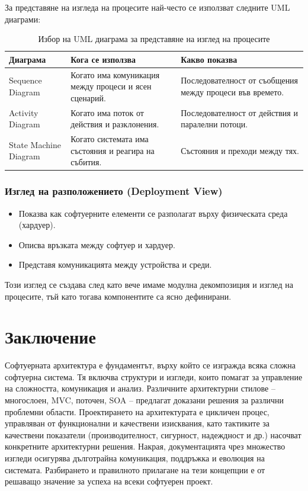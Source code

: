 \documentclass{scrartcl}
\begin{document}
\begin{FlushLeft}
За представяне на изгледа на процесите най-често се използват следните UML диаграми:

\begin{table}[H]
\centering
\caption{Избор на UML диаграма за представяне на изглед на процесите}
\begin{tabular}{|p{3cm}|p{4cm}|p{5cm}|}
\hline
\textbf{Диаграма} & \textbf{Кога се използва} & \textbf{Какво показва} \\
\hline
Sequence Diagram & Когато има комуникация между процеси и ясен сценарий. & Последователност от съобщения между процеси във времето. \\
\hline
Activity Diagram & Когато има поток от действия и разклонения. & Последователност от действия и паралелни потоци. \\
\hline
State Machine Diagram & Когато системата има състояния и реагира на събития. & Състояния и преходи между тях. \\
\hline
\end{tabular}
\end{table}

\subsubsection{Изглед на разположението (Deployment View)}
\begin{itemize}
    \item Показва как софтуерните елементи се разполагат върху физическата среда (хардуер).
    \item Описва връзката между софтуер и хардуер.
    \item Представя комуникацията между устройства и среди.
\end{itemize}
Този изглед се създава след като вече имаме модулна декомпозиция и изглед на процесите, тъй като тогава компонентите са ясно дефинирани.

\section*{Заключение}

Софтуерната архитектура е фундаментът, върху който се изгражда всяка сложна софтуерна система. Тя включва структури и изгледи, които помагат за управление на сложността, комуникация и анализ. Различните архитектурни стилове – многослоен, MVC, поточен, SOA – предлагат доказани решения за различни проблемни области. Проектирането на архитектурата е цикличен процес, управляван от функционални и качествени изисквания, като тактиките за качествени показатели (производителност, сигурност, надеждност и др.) насочват конкретните архитектурни решения. Накрая, документацията чрез множество изгледи осигурява дълготрайна комуникация, поддръжка и еволюция на системата. Разбирането и правилното прилагане на тези концепции е от решаващо значение за успеха на всеки софтуерен проект.

\end{FlushLeft}
\end{document}
